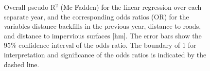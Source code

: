 \documentclass[11pt, A4, oneside]{report}
\begin{document}
\begin{figure}[H]
\caption{Overall pseudo R$^2$ (Mc Fadden) for the linear regression over each separate year, and the corresponding odds ratios (OR) for the variables distance backfills in the previous year, distance to roads, and distance to impervious surfaces [hm]. The error bars show the 95\% confidence interval of the odds ratio. The boundary of 1 for interpretation and significance of the odds ratios is indicated by the dashed line.}
\label{fig:logitimeseriesBF}
\end{figure}
\end{document}
